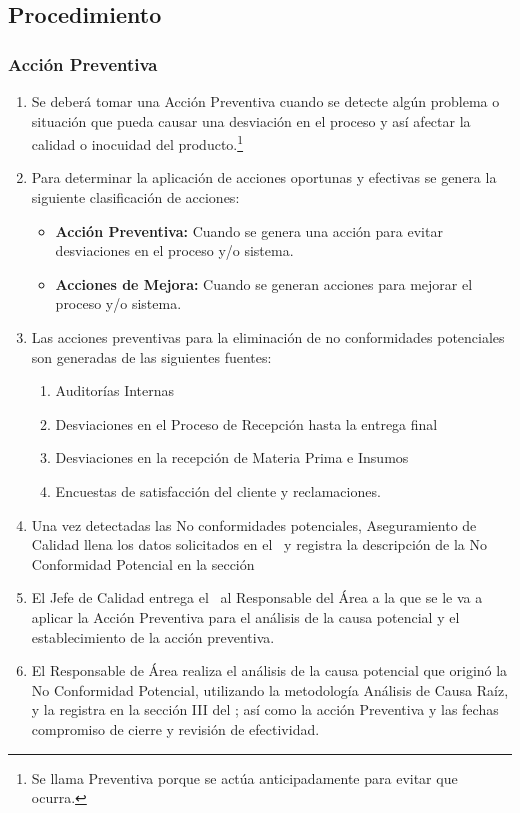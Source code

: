 \subsection{Procedimiento}

\subsubsection{Acción Preventiva}
\begin{enumerate}
\item Se deberá tomar una Acción Preventiva cuando se detecte algún problema o situación que pueda causar una desviación en el proceso y así afectar la calidad o inocuidad del producto.\footnote{Se llama Preventiva porque se actúa anticipadamente para evitar que ocurra.}
\item Para determinar la aplicación de acciones oportunas y efectivas se genera la siguiente clasificación de acciones:
\begin{itemize}
\item \textbf{Acción Preventiva:} Cuando se genera una acción para evitar desviaciones en el proceso y/o sistema.
\item \textbf{Acciones de Mejora:} Cuando se generan acciones para mejorar el proceso y/o sistema.
\end{itemize}
\item Las acciones preventivas para la eliminación de no conformidades potenciales son generadas de las siguientes fuentes:
\begin{enumerate}
	\item Auditorías Internas
	\item Desviaciones en el Proceso de Recepción hasta la entrega final
	\item Desviaciones en la recepción de Materia Prima e Insumos
	\item Encuestas de satisfacción del cliente y reclamaciones.
	\end{enumerate}
\item Una vez detectadas las No conformidades potenciales, Aseguramiento de Calidad llena los datos solicitados en el \RAC~y registra la descripción de la No Conformidad Potencial en la sección
\item El Jefe de Calidad entrega el \RAC~al Responsable del Área a la que se le va a aplicar la Acción Preventiva para el análisis de la causa potencial y el establecimiento de la acción preventiva.
\item El Responsable de Área realiza el análisis de la causa potencial que originó la No Conformidad Potencial, utilizando la metodología Análisis de Causa Raíz, y la registra en la sección III del \RAC; así como la acción Preventiva y las fechas compromiso de cierre y revisión de efectividad.

\end{enumerate}
